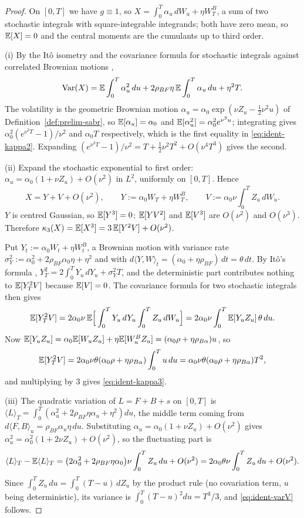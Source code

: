 \documentclass[../../../main.tex]{subfiles}
\begin{document}
\begin{proof}
On $[0,T]$ we have $g\equiv1$, so $X=\int_0^T\alpha_u\,dW_u+\eta W^B_T$, a sum of two stochastic integrals with square-integrable integrands; both have zero mean, so $\mathbb{E}[X]=0$ and the central moments are the cumulants up to third order.

(i) By the It\^o isometry and the covariance formula for stochastic integrals against correlated Brownian motions \citep[Ch.~3, pp.~128--238]{karatzas1991},
\[
\operatorname{Var}(X)=\mathbb{E}\int_0^T\alpha_u^2\,du+2\rho_{BF}\eta\,\mathbb{E}\int_0^T\alpha_u\,du+\eta^2T .
\]
The volatility is the geometric Brownian motion $\alpha_u=\alpha_0\exp(\nu Z_u-\tfrac12\nu^2u)$ of Definition~\ref{def:prelim-sabr}, so $\mathbb{E}[\alpha_u]=\alpha_0$ and $\mathbb{E}[\alpha_u^2]=\alpha_0^2e^{\nu^2u}$; integrating gives $\alpha_0^2(e^{\nu^2T}-1)/\nu^2$ and $\alpha_0T$ respectively, which is the first equality in \eqref{eq:ident-kappa2}. Expanding $(e^{\nu^2T}-1)/\nu^2=T+\tfrac12\nu^2T^2+O(\nu^4T^3)$ gives the second.

(ii) Expand the stochastic exponential to first order: $\alpha_u=\alpha_0(1+\nu Z_u)+O(\nu^2)$ in $L^2$, uniformly on $[0,T]$. Hence
\[
X=Y+V+O(\nu^2),\qquad Y:=\alpha_0W_T+\eta W^B_T,\qquad V:=\alpha_0\nu\int_0^TZ_u\,dW_u .
\]
$Y$ is centred Gaussian, so $\mathbb{E}[Y^3]=0$; $\mathbb{E}[YV^2]$ and $\mathbb{E}[V^3]$ are $O(\nu^2)$ and $O(\nu^3)$. Therefore $\kappa_3(X)=\mathbb{E}[X^3]=3\,\mathbb{E}[Y^2V]+O(\nu^2)$.

Put $Y_t:=\alpha_0W_t+\eta W^B_t$, a Brownian motion with variance rate $\sigma_Y^2:=\alpha_0^2+2\rho_{BF}\alpha_0\eta+\eta^2$ and with $d\langle Y,W\rangle_t=(\alpha_0+\eta\rho_{BF})\,dt=\theta\,dt$. By It\^o's formula \citep[Thm.~3.3.6]{karatzas1991}, $Y_T^2=2\int_0^TY_u\,dY_u+\sigma_Y^2T$, and the deterministic part contributes nothing to $\mathbb{E}[Y_T^2V]$ because $\mathbb{E}[V]=0$. The covariance formula for two stochastic integrals then gives
\[
\mathbb{E}[Y_T^2V]=2\alpha_0\nu\,\mathbb{E}\Big[\int_0^TY_u\,dY_u\int_0^TZ_u\,dW_u\Big]=2\alpha_0\nu\int_0^T\mathbb{E}[Y_uZ_u]\,\theta\,du .
\]
Now $\mathbb{E}[Y_uZ_u]=\alpha_0\mathbb{E}[W_uZ_u]+\eta\mathbb{E}[W^B_uZ_u]=(\alpha_0\rho+\eta\rho_{B\alpha})u$, so
\[
\mathbb{E}[Y_T^2V]=2\alpha_0\nu\theta(\alpha_0\rho+\eta\rho_{B\alpha})\int_0^Tu\,du=\alpha_0\nu\theta(\alpha_0\rho+\eta\rho_{B\alpha})T^2,
\]
and multiplying by $3$ gives \eqref{eq:ident-kappa3}.

(iii) The quadratic variation of $L=F+B+s$ on $[0,T]$ is $\langle L\rangle_T=\int_0^T(\alpha_u^2+2\rho_{BF}\eta\alpha_u+\eta^2)du$, the middle term coming from $d\langle F,B\rangle_u=\rho_{BF}\alpha_u\eta\,du$. Substituting $\alpha_u=\alpha_0(1+\nu Z_u)+O(\nu^2)$ gives $\alpha_u^2=\alpha_0^2(1+2\nu Z_u)+O(\nu^2)$, so the fluctuating part is
\[
\langle L\rangle_T-\mathbb{E}\langle L\rangle_T=\big(2\alpha_0^2+2\rho_{BF}\eta\alpha_0\big)\nu\int_0^TZ_u\,du+O(\nu^2)=2\alpha_0\theta\nu\int_0^TZ_u\,du+O(\nu^2).
\]
Since $\int_0^TZ_u\,du=\int_0^T(T-u)\,dZ_u$ by the product rule (no covariation term, $u$ being deterministic), its variance is $\int_0^T(T-u)^2du=T^3/3$, and \eqref{eq:ident-varV} follows.
\end{proof}
\end{document}
